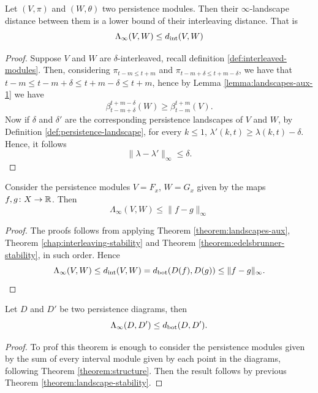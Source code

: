 \begin{theorem} \label{theorem:landscapes-aux}
    Let $ (V, \pi) $ and $ (W, \theta) $ two persistence modules. Then their $\infty$-landscape distance between them is a lower bound of their interleaving distance. That is
    \begin{equation}
        \Lambda_{\infty}(V, W) \leq d_{\operatorname{int}}(V, W)
    \end{equation}
\end{theorem}
\begin{proof}
    Suppose $ V $ and $ W $ are $\delta$-interleaved, recall definition \ref{def:interleaved-modules}. Then, considering $ \pi_{t-m \leq t+m} $ and $ \pi_{t-m + \delta \leq t+m - \delta } $, we have that $ t-m \leq t-m + \delta \leq t+m - \delta \leq t+m $, hence by Lemma \ref{lemma:landscapes-aux-1} we have
    \begin{equation}
        \beta_{t-m+\delta}^{t+m-\delta}(W) \geq \beta_{t-m}^{t+m}(V).
    \end{equation}
    Now if $ \delta $ and $ \delta' $ are the corresponding persistence landscapes of $ V $ and $ W $, by Definition \ref{def:persistence-landscape}, for every $ k \leq 1 $, $ \lambda'(k, t) \geq \lambda(k, t) - \delta $. Hence, it follows
    \begin{equation}
        \|\lambda - \lambda'\|_\infty \leq \delta.
    \end{equation}
\end{proof}

\begin{theorem} \label{theorem:landscape-stability}
    Consider the persistence modules $ V = F_x $, $ W = G_x $ given by the maps $ f, g \colon X \to \mathbb R $. Then
    \begin{equation}
        \Lambda_\infty(V, W) \leq \| f - g\|_\infty
    \end{equation}
\end{theorem}
\begin{proof}
    The proofs follows from applying Theorem \ref{theorem:landscapes-aux}, Theorem \ref{chap:interleaving-stability} and Theorem \ref{theorem:edelsbrunner-stability}, in such order. Hence
    \begin{equation}
        \Lambda_\infty(V, W) \leq d_{\operatorname{int}}(V, W) = d_{\operatorname{bot}}(D(f), D(g)) \leq \| f - g\|_\infty.
    \end{equation}
\end{proof}

\begin{theorem}
    Let $ D $ and $ D' $ be two persistence diagrams, then
    \begin{equation}
        \Lambda_\infty(D, D') \leq d_{\operatorname{bot}}(D, D').
    \end{equation}
\end{theorem}
\begin{proof}
    To prof this theorem is enough to consider the persistence modules given by the sum of every interval module given by each point in the diagrams, following Theorem \ref{theorem:structure}. Then the result follows by previous Theorem \ref{theorem:landscape-stability}.
\end{proof}

